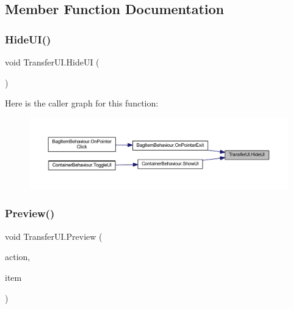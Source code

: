 \subsection{Member Function Documentation}
\mbox{\label{class_transfer_u_i_a5c4b5956098b374e40ea084d7fbe7739}} 
\subsubsection{\texorpdfstring{HideUI()}{HideUI()}}
{\footnotesize\ttfamily void Transfer\+U\+I.\+Hide\+UI (\begin{DoxyParamCaption}{ }\end{DoxyParamCaption})}

Here is the caller graph for this function\+:
\nopagebreak
\begin{figure}[H]
\begin{center}
\leavevmode
\includegraphics[width=350pt]{class_transfer_u_i_a5c4b5956098b374e40ea084d7fbe7739_icgraph}
\end{center}
\end{figure}
\mbox{\label{class_transfer_u_i_a9d2e7c3708193e3d51fe8539f9c41a75}} 
\subsubsection{\texorpdfstring{Preview()}{Preview()}\hspace{0.1cm}{\footnotesize\ttfamily [1/2]}}
{\footnotesize\ttfamily void Transfer\+U\+I.\+Preview (\begin{DoxyParamCaption}\item[{\mbox{\hyperlink{class_bag_behaviour_aeafbbbda3c9a34d1a73647a8b274788c}{Bag\+Behaviour.\+Actions}}}]{action,  }\item[{\mbox{\hyperlink{class_base_item}{Base\+Item}}}]{item }\end{DoxyParamCaption})}

